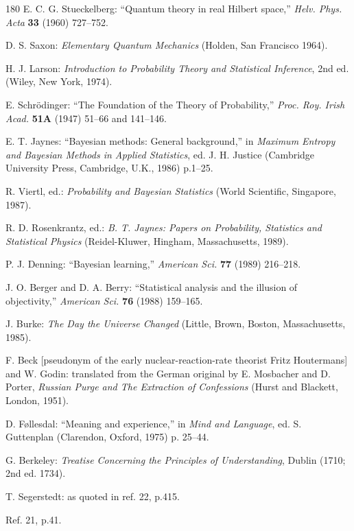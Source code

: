 \documentclass[11pt]{article}
\begin{document}
\begin{thebibliography}{180}
		E. C. G. Stueckelberg: ``Quantum theory in real Hilbert space,'' \emph{Helv. Phys. Acta} \textbf{33} (1960) 727--752.
		
		D. S. Saxon: \emph{Elementary Quantum Mechanics} (Holden, San Francisco 1964).
		
		H. J. Larson: \emph{Introduction to Probability Theory and Statistical Inference}, 2nd ed. (Wiley, New York, 1974).
		
		E. Schrödinger: ``The Foundation of the Theory of Probability,'' \emph{Proc. Roy. Irish Acad.} \textbf{51A} (1947) 51--66 and 141--146.
		
		E. T. Jaynes: ``Bayesian methods: General background,'' in \emph{Maximum Entropy and Bayesian Methods in Applied Statistics}, ed. J. H. Justice (Cambridge University Press, Cambridge, U.K., 1986) p.1--25.
		
		R. Viertl, ed.: \emph{Probability and Bayesian Statistics} (World Scientific, Singapore, 1987).
		
		R. D. Rosenkrantz, ed.: \emph{B. T. Jaynes: Papers on Probability, Statistics and Statistical Physics} (Reidel-Kluwer, Hingham, Massachusetts, 1989).
		
		P. J. Denning: ``Bayesian learning,'' \emph{American Sci.} \textbf{77} (1989) 216--218.
		
		J. O. Berger and D. A. Berry: ``Statistical analysis and the illusion of objectivity,'' \emph{American Sci.} \textbf{76} (1988) 159--165.
		
		J. Burke: \emph{The Day the Universe Changed} (Little, Brown, Boston, Massachusetts, 1985).
		
		F. Beck [pseudonym of the early nuclear-reaction-rate theorist Fritz Houtermans] and W. Godin: translated from the German original by E. Mosbacher and D. Porter, \emph{Russian Purge and The Extraction of Confessions} (Hurst and Blackett, London, 1951).
		
		D. Føllesdal: ``Meaning and experience,'' in \emph{Mind and Language}, ed. S. Guttenplan (Clarendon, Oxford, 1975) p. 25--44.
		
		G. Berkeley: \emph{Treatise Concerning the Principles of Understanding}, Dublin (1710; 2nd ed. 1734).
		
		T. Segerstedt: as quoted in ref. 22, p.415.
		
		Ref. 21, p.41.
		

\end{thebibliography}
\end{document}
